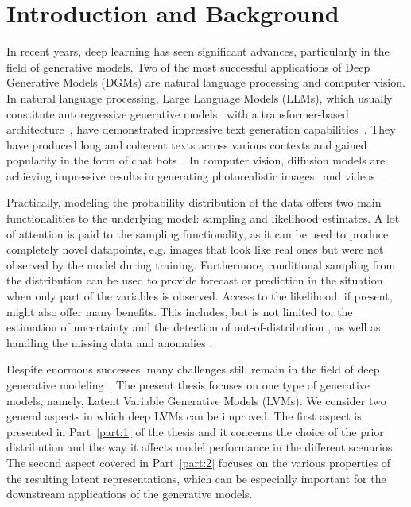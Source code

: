 \chapter{Introduction and Background}


In recent years, deep learning has seen significant advances, particularly in the field of generative models. Two of the most successful applications of Deep Generative Models (DGMs) are natural language processing and computer vision. In natural language processing, Large Language Models (LLMs), which usually constitute autoregressive generative models~\citep{graves2013generating} with a transformer-based architecture~\citep{vaswani2017attention}, have demonstrated impressive text generation capabilities~\citep{brown2020language,chowdhery2023palm}. They have produced long and coherent texts across various contexts and gained popularity in the form of chat bots~\citep{achiam2023gpt}. In computer vision, diffusion models are achieving impressive results in generating photorealistic images~\citep{dhariwal2021diffusion} and videos~\citep{ho2022video}.


Practically, modeling the probability distribution of the data offers two main functionalities to the underlying model: sampling and likelihood estimates. A lot of attention is paid to the sampling functionality, as it can be used to produce completely novel datapoints, e.g. images that look like real ones but were not observed by the model during training. Furthermore, conditional sampling from the distribution can be used to provide forecast or prediction in the situation when only part of the variables is observed. Access to the likelihood, if present, might also offer many benefits. This includes, but is not limited to, the estimation of uncertainty and the detection of out-of-distribution \cite{havtorn2021hierarchical, kadavath2022language}, as well as handling the missing data \cite{mattei2019miwae} and anomalies \citep{an2015variational}.

Despite enormous successes, many challenges still remain in the field of deep generative modeling~\citep{manduchi2024challenges}. The present thesis focuses on one type of generative models, namely, Latent Variable Generative Models (LVMs). We consider two general aspects in which deep LVMs can be improved. The first aspect is presented in Part~\ref{part:1} of the thesis and it concerns the choice of the prior distribution and the way it affects model performance in the different scenarios. The second aspect covered in Part~\ref{part:2} focuses on the various properties of the resulting latent representations, which can be especially important for the downstream applications of the generative models. 

